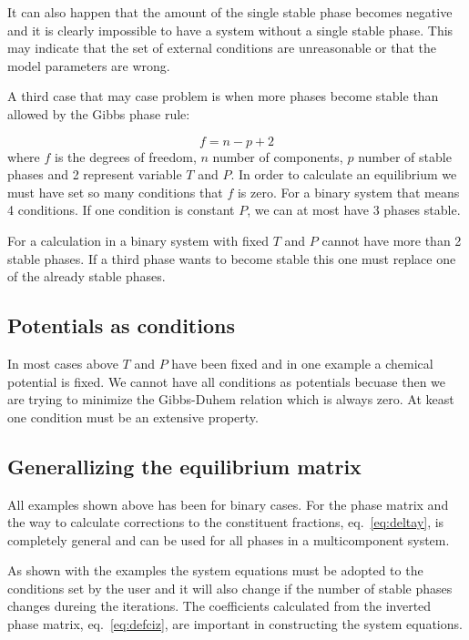 \documentclass[12pt]{article}
\begin{document}
It can also happen that the amount of the single stable phase becomes
negative and it is clearly impossible to have a system without a
single stable phase.  This may indicate that the set of external
conditions are unreasonable or that the model parameters are wrong.

A third case that may case problem is when more phases become stable
than allowed by the Gibbs phase rule:

\begin{equation}
f = n - p + 2
\end{equation}
where $f$ is the degrees of freedom, $n$ number of components, $p$
number of stable phases and 2 represent variable $T$ and $P$.  In
order to calculate an equilibrium we must have set so many conditions
that $f$ is zero.  For a binary system that means 4 conditions.  If
one condition is constant $P$, we can at most have 3 phases stable.

For a calculation in a binary system with fixed $T$ and $P$ cannot
have more than 2 stable phases.  If a third phase wants to become
stable this one must replace one of the already stable phases.

\subsection{Potentials as conditions}

In most cases above $T$ and $P$ have been fixed and in one example a
chemical potential is fixed.  We cannot have all conditions as
potentials becuase then we are trying to minimize the Gibbs-Duhem
relation which is always zero.  At keast one condition must be an
extensive property.

\subsection{Generallizing the equilibrium matrix}

All examples shown above has been for binary cases.  For the phase
matrix and the way to calculate corrections to the constituent
fractions, eq.~\ref{eq:deltay}, is completely general and can be used
for all phases in a multicomponent system.

As shown with the examples the system equations must be adopted to the
conditions set by the user and it will also change if the number of
stable phases changes dureing the iterations.  The coefficients
calculated from the inverted phase matrix, eq.~\ref{eq:defciz}, are
important in constructing the system equations.
\end{document}
